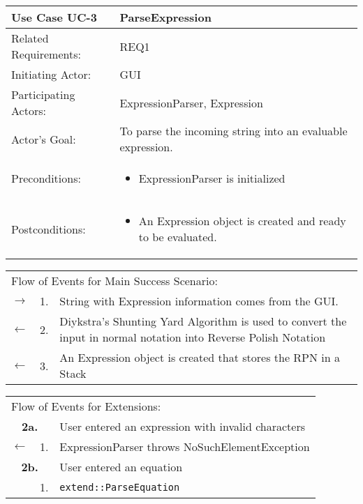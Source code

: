 \documentclass[11pt]{article}
\newcommand{\code}[1]{\texttt{#1}}
\begin{document}
\newpage

\begin{center}
\begin{tabular}{p{1.5in}p{5in}}
\hline
\textbf{Use Case UC-3}     & \textbf{ParseExpression} \\ \hline
Related Requirements: & REQ1 \\
Initiating Actor:     & GUI \\
Participating Actors: & ExpressionParser, Expression \\
Actor's Goal:          & To parse the incoming string into an evaluable expression. \\
Preconditions:         & \begin{itemize}[nosep]
		      \item  ExpressionParser is initialized
                         \end{itemize} \\
Postconditions:        & \begin{itemize}[nosep]
                         \item An Expression object is created and ready to be evaluated.
                         \end{itemize} \\ \hline
\end{tabular}

\begin{tabular}{p{.25in}p{.25in}p{5.8in}}
\multicolumn{3}{l}{Flow of Events for Main Success Scenario:} \\
$\rightarrow$ & 1. & String with Expression information comes from the GUI. \\
$\leftarrow$  & 2. & Diykstra's Shunting Yard Algorithm is used to convert the input in normal notation into Reverse Polish Notation\\
$\leftarrow$  & 3. & An Expression object is created that stores the  RPN in a Stack \\
\end{tabular}

\begin{tabular}{p{.25in}p{.25in}p{5.8in}}
\multicolumn{3}{l}{Flow of Events for Extensions:} \\
\multicolumn{2}{c}{\textbf{2a.}} & User entered an expression with invalid characters \\
$\leftarrow$  & 1.           & ExpressionParser throws NoSuchElementException\\

\multicolumn{2}{c}{\textbf{2b.}} & User entered an equation\\
 & 1.           & \code{extend::ParseEquation}\\

\end{tabular}
\end{center}
\end{document}
